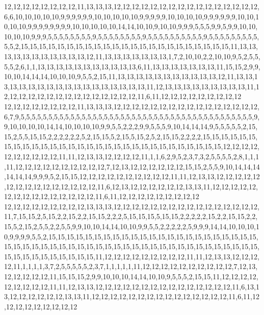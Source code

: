 12,12,12,12,12,12,12,12,11,13,13,13,12,12,12,12,12,12,12,12,12,12,12,12,12,12,12,12,6,6,10,10,10,10,10,9,9,9,9,9,9,10,10,10,10,10,9,9,9,9,9,10,10,10,10,9,9,9,9,9,9,10,10,10,10,10,9,9,9,9,9,9,9,9,10,10,10,10,10,14,14,10,10,9,10,10,9,9,9,5,5,5,9,9,5,9,9,10,10,10,10,10,9,9,9,5,5,5,5,5,5,5,5,9,5,5,5,5,5,5,5,5,9,5,5,5,5,5,5,5,5,5,5,9,5,5,5,5,5,5,5,5,5,5,5,2,15,15,15,15,15,15,15,15,15,15,15,15,15,15,15,15,15,15,15,15,15,15,15,11,13,13,13,13,13,13,13,13,13,13,13,12,11,13,13,13,13,13,13,13,1,7,2,10,10,2,2,10,10,9,5,2,5,5,5,5,2,6,1,1,13,13,13,13,13,13,13,13,13,13,13,6,11,13,13,13,13,13,13,13,11,15,15,2,9,9,10,10,14,14,14,10,10,10,9,5,5,2,15,11,13,13,13,13,13,13,13,13,13,13,13,12,11,13,13,13,13,13,13,13,13,13,13,13,13,13,13,13,13,13,13,11,12,13,13,13,13,13,13,13,13,13,11,12,12,12,12,12,12,12,12,12,12,12,12,12,12,12,11,6,11,12,12,12,12,12,12,12,12,12
12,12,12,12,12,12,12,12,11,13,13,13,12,12,12,12,12,12,12,12,12,12,12,12,12,12,12,12,6,7,9,5,5,5,5,5,5,5,5,5,5,5,5,5,5,5,5,5,5,5,5,5,5,5,5,5,5,5,5,5,5,5,5,5,5,5,5,5,5,5,5,5,5,9,9,10,10,10,10,14,14,10,10,10,10,9,9,5,5,2,2,2,9,9,5,5,5,9,10,14,14,14,9,5,5,5,5,5,2,15,15,2,5,5,15,15,2,2,2,2,2,2,5,2,15,15,5,2,15,5,15,2,5,2,15,15,2,2,2,2,15,15,15,15,15,15,15,15,15,15,15,15,15,15,15,15,15,15,15,15,15,15,15,15,15,15,15,15,15,15,12,12,12,12,12,12,12,12,12,12,11,11,12,13,13,12,12,12,12,11,1,1,6,2,9,5,2,3,7,3,2,5,5,5,5,2,8,1,1,1,11,12,12,12,12,12,12,12,12,12,12,7,12,13,12,12,12,12,12,12,15,15,2,5,5,9,10,14,14,14,14,14,14,9,9,9,5,2,15,15,12,12,12,12,12,12,12,12,12,12,11,11,12,13,13,12,12,12,12,12,12,12,12,12,12,12,12,12,12,12,11,6,12,13,12,12,12,12,12,12,13,13,11,12,12,12,12,12,12,12,12,12,12,12,12,12,12,12,11,6,11,12,12,12,12,12,12,12,12,12
12,12,12,12,12,12,12,12,12,13,13,13,12,12,12,12,12,12,12,12,12,12,12,12,12,12,12,12,11,7,15,15,2,5,15,2,2,15,2,2,15,15,2,2,2,5,15,15,15,5,15,15,2,2,2,2,2,15,2,2,15,15,2,2,15,5,2,15,2,5,5,2,2,5,5,9,9,10,10,14,14,10,10,9,9,5,5,2,2,2,2,2,5,9,9,9,14,14,10,10,10,10,9,9,9,9,5,5,2,15,15,15,15,15,15,15,15,15,15,15,15,15,15,15,15,15,15,15,15,15,15,15,15,15,15,15,15,15,15,15,15,15,15,15,15,15,15,15,15,15,15,15,15,15,15,15,15,15,15,15,15,15,15,15,15,15,15,15,15,15,11,12,12,12,12,12,12,12,12,12,11,11,12,13,13,12,12,12,12,11,1,1,1,1,3,7,2,5,5,5,5,5,2,3,7,1,1,1,1,1,11,12,12,12,12,12,12,12,12,12,12,7,12,13,12,12,12,12,12,11,15,15,15,2,9,9,10,10,10,14,14,10,10,9,5,5,5,2,15,15,11,12,12,12,12,12,12,12,12,12,11,11,12,13,13,12,12,12,12,12,12,12,12,12,12,12,12,12,12,12,11,6,13,13,12,12,12,12,12,12,13,13,11,12,12,12,12,12,12,12,12,12,12,12,12,12,12,12,11,6,11,12,12,12,12,12,12,12,12,12
